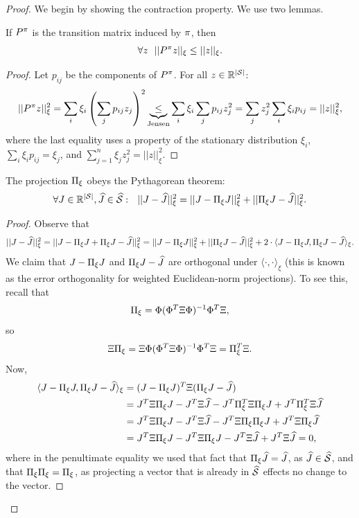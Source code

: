 \begin{proof}
We begin by showing the contraction property. We use two lemmas.
\begin{lemma}\label{lem:P_non_expansion} If $P^\pi$ is the transition matrix induced by $\pi$, then
$$\forall z \ \ ||P^\pi z||_\xi \le ||z||_\xi.$$
\end{lemma}
\begin{proof}
Let $p_{ij}$ be the components of $P^\pi$. For all $z \in \mathbb{R}^{|\mathcal{S}|}$:
$$||P^\pi z||_\xi^2 = \sum_i \xi_i\left(\sum_j p_{ij}z_j\right)^2 \underbrace{\leq}_{\textrm{Jensen}} \sum_i \xi_i \sum_j p_{ij} z_j^2 =  \sum_j z_j^2 \sum_i\xi_i p_{ij} = ||z||_\xi^2,$$
where the last equality uses a property of the stationary distribution $\xi_i$, $\sum_i\xi_i p_{ij}  =\xi_j$, and
$\sum_{j=1}^n\xi_j z_j^2 = ||z||_\xi^2.$
\end{proof}
\begin{lemma}\label{lem:pythagorian}
The projection $\Pi_\xi$ obeys the Pythagorean theorem:
$$\forall J\in \mathbb{R}^{|\States|}, \widehat{J}\in \ftrspace: \ \ ||J-\widehat{J}||_\xi^2 = ||J-\Project_\xi J||_\xi^2 + ||\Project_\xi J - \widehat{J}||_\xi^2.$$
\end{lemma}
\begin{proof}
Observe that
$$||J-\widehat{J}||_\xi^2 = ||J-\Pi_\xi J + \Pi_\xi J - \widehat{J}||_\xi^2 = ||J-\Pi_\xi J||_\xi^2 + ||\Pi_\xi J - \widehat{J}||_\xi^2 + 2 \cdot \langle J-\Pi_\xi J, \Pi_\xi J - \widehat{J}\rangle_\xi.$$
We claim that $J-\Pi_\xi J$ and $\Pi_\xi J-\widehat{J}$ are orthogonal under $\langle\cdot,\cdot\rangle_\xi$ (this is known as the error orthogonality for weighted Euclidean-norm projections). To see this, recall that 
$$
\Pi_\xi = \Phi (\Phi^T \Xi \Phi)^{-1} \Phi^T \Xi,
$$
so
$$
\Xi \Pi_\xi = \Xi \Phi (\Phi^T \Xi \Phi)^{-1} \Phi^T \Xi = \Pi_\xi^T \Xi.
$$
Now, 
\begin{equation*}
    \begin{split}
        \langle J-\Pi_\xi J, \Pi_\xi J - \widehat{J}\rangle_\xi &= (J-\Pi_\xi J)^T \Xi (\Pi_\xi J - \widehat{J}) \\
        &= J^T \Xi \Pi_\xi J - J^T \Xi \widehat{J} - J^T \Pi_\xi^T \Xi \Pi_\xi J + J^T \Pi_\xi^T \Xi \widehat{J} \\
        &= J^T \Xi \Pi_\xi J - J^T \Xi \widehat{J} - J^T \Xi \Pi_\xi \Pi_\xi J + J^T \Xi\Pi_\xi \widehat{J} \\
        &= J^T \Xi \Pi_\xi J - J^T \Xi \Pi_\xi J - J^T \Xi \widehat{J} + J^T \Xi \widehat{J} = 0,
    \end{split}
\end{equation*}
where in the penultimate equality we used that fact that $\Pi_\xi \widehat{J} = \widehat{J}$, as $\widehat{J}\in \widehat{\mathcal{S}}$, and that $\Pi_\xi \Pi_\xi = \Pi_\xi$, as projecting a vector that is already in $\widehat{\mathcal{S}}$ effects no change to the vector.
\end{proof}


\end{proof}
